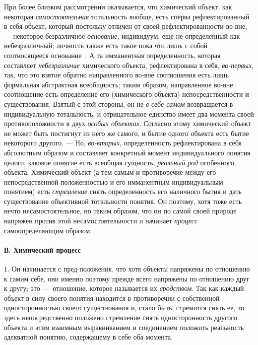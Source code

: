 \documentclass[twoside]{article}
\begin{document}
{{{При более близком рассмотрении оказывается, что химический
объект, как некоторая
{\em самостоятельная}
тотальность вообще, есть сперва рефлектированный в себя
объект, который постольку отличен от своей рефлектированности во-вне, —
некоторое безразличное
{\em основание},
индивидуум, еще не определенный как небезразличный; личность
также есть такое пока что лишь с собой соотносящееся
основание~\label{bkm:bm82}.
А та имманентная определенность, которая составляет
{\em небезразличие}
химического объекта, рефлектирована в себя,
{\em во-первых}, так, что
это взятие обратно направленного во-вне соотношения есть лишь формальная
абстрактная всеобщность; таким образом, направленное во-вне соотношение
есть определение его (химического объекта) непосредственности и
существования. Взятый с этой стороны, он не
{\em в себе самом}
возвращается в индивидуальную тотальность, и отрицательное
единство имеет два момента своей противоположности в двух
{\em особых объектах}.
Согласно этому химический объект не может быть постигнут из
него же самого, и бытие одного объекта есть бытие некоторого другого. —
Но, {\em во-вторых},
определенность рефлектирована в себя абсолютным образом и
составляет конкретный момент индивидуального понятия целого, каковое
понятие есть всеобщая сущность,
{\em реальный род}
особенного объекта. Химический объект (а тем самым и
противоречие между его непосредственной положенностью и его имманентным
индивидуальным понятием) есть
{\em стремление} снять
определенность его наличного бытия и дать существование объективной
тотальности понятия. Он поэтому, хотя тоже есть нечто несамостоятельное, но
таким образом, что он по самой своей природе напряжен против этой
несамостоятельности и начинает
{\em процесс}
самоопределяющим образом.

\paragraph[В. Химический процесс]{В. Химический процесс}
1. Он начинается с пред-положения, что хотя объекты напряжены
по отношению к самим себе, они именно поэтому прежде всего напряжены по
отношению друг к другу; это —~отношение, которое называется
их {\em сродством}. Так
как каждый объект в силу своего понятия находится в противоречии с
собственной односторонностью своего существования и, стало быть, стремится
снять ее, то здесь непосредственно положено стремление снять
односторонность другого объекта и этим взаимным выравниванием и соединением
положить реальность адекватной понятию, содержащему в себе оба момента.

}}}
\end{document}

